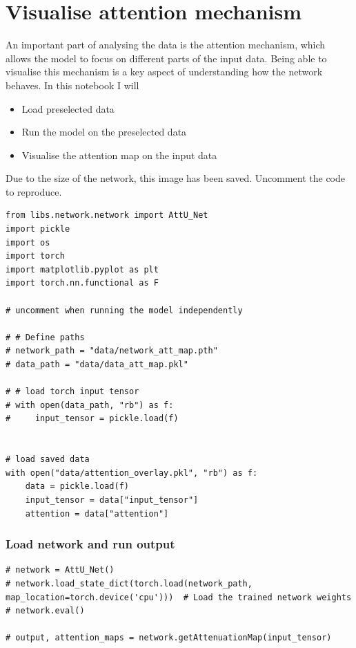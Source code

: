 \section{Visualise attention mechanism}

An important part of analysing the data is the attention mechanism, which allows the model to focus on different parts of the input data. Being able to visualise this mechanism is a key aspect of understanding how the network behaves. In this notebook I will

\begin{itemize}
\item Load preselected data
\item Run the model on the preselected data
\item Visualise the attention map on the input data
\end{itemize}

Due to the size of the network, this image has been saved. Uncomment the code to reproduce.

\begin{verbatim}
from libs.network.network import AttU_Net
import pickle
import os
import torch
import matplotlib.pyplot as plt
import torch.nn.functional as F

# uncomment when running the model independently

# # Define paths
# network_path = "data/network_att_map.pth"
# data_path = "data/data_att_map.pkl"

# # load torch input tensor
# with open(data_path, "rb") as f:
#     input_tensor = pickle.load(f)


# load saved data
with open("data/attention_overlay.pkl", "rb") as f:
    data = pickle.load(f)
    input_tensor = data["input_tensor"]
    attention = data["attention"]
\end{verbatim}

\subsubsection{Load network and run output}

\begin{verbatim}
# network = AttU_Net()
# network.load_state_dict(torch.load(network_path, map_location=torch.device('cpu')))  # Load the trained network weights
# network.eval()

# output, attention_maps = network.getAttenuationMap(input_tensor)
\end{verbatim}

